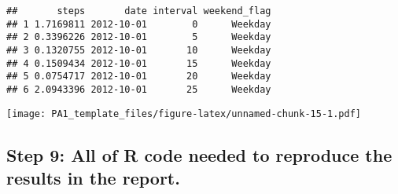 \documentclass[]{article}
\newenvironment{Shaded}{\begin{snugshade}}{\end{snugshade}}
\newcommand{\DataTypeTok}[1]{\textcolor[rgb]{0.13,0.29,0.53}{#1}}
\newcommand{\KeywordTok}[1]{\textcolor[rgb]{0.13,0.29,0.53}{\textbf{#1}}}
\newcommand{\NormalTok}[1]{#1}
\newcommand{\OperatorTok}[1]{\textcolor[rgb]{0.81,0.36,0.00}{\textbf{#1}}}
\newcommand{\StringTok}[1]{\textcolor[rgb]{0.31,0.60,0.02}{#1}}
\begin{document}
\begin{verbatim}
##       steps       date interval weekend_flag
## 1 1.7169811 2012-10-01        0      Weekday
## 2 0.3396226 2012-10-01        5      Weekday
## 3 0.1320755 2012-10-01       10      Weekday
## 4 0.1509434 2012-10-01       15      Weekday
## 5 0.0754717 2012-10-01       20      Weekday
## 6 2.0943396 2012-10-01       25      Weekday
\end{verbatim}

\begin{Shaded}
\end{Shaded}

\texttt{[image: PA1\_template\_files/figure-latex/unnamed-chunk-15-1.pdf]}

\hypertarget{step-9-all-of-r-code-needed-to-reproduce-the-results-in-the-report.}{%
\subsection{Step 9: All of R code needed to reproduce the results in the
report.}\label{step-9-all-of-r-code-needed-to-reproduce-the-results-in-the-report.}}
\end{document}
